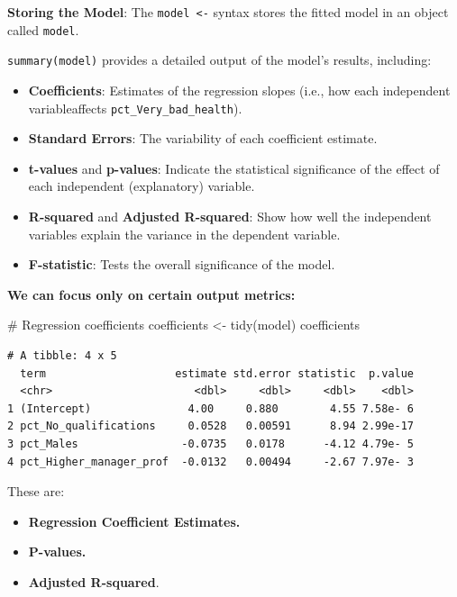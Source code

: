 \documentclass[
  letterpaper,
  DIV=11,
  numbers=noendperiod]{scrreprt}
\newenvironment{Shaded}{\begin{snugshade}}{\end{snugshade}}
\newcommand{\CommentTok}[1]{\textcolor[rgb]{0.37,0.37,0.37}{#1}}
\newcommand{\FunctionTok}[1]{\textcolor[rgb]{0.28,0.35,0.67}{#1}}
\newcommand{\NormalTok}[1]{\textcolor[rgb]{0.00,0.23,0.31}{#1}}
\newcommand{\OtherTok}[1]{\textcolor[rgb]{0.00,0.23,0.31}{#1}}
\providecommand{\tightlist}{%
  \setlength{\itemsep}{0pt}\setlength{\parskip}{0pt}}\usepackage{longtable,booktabs,array}
\begin{document}
\textbf{Storing the Model}: The \texttt{model\ \textless{}-} syntax
stores the fitted model in an object called \texttt{model}.

\texttt{summary(model)} provides a detailed output of the model's
results, including:

\begin{itemize}
\tightlist
\item
  \textbf{Coefficients}: Estimates of the regression slopes (i.e., how
  each independent variableaffects \texttt{pct\_Very\_bad\_health}).
\item
  \textbf{Standard Errors}: The variability of each coefficient
  estimate.
\item
  \textbf{t-values} and \textbf{p-values}: Indicate the statistical
  significance of the effect of each independent (explanatory)
  variable.\\
\item
  \textbf{R-squared} and \textbf{Adjusted R-squared}: Show how well the
  independent variables explain the variance in the dependent variable.
\item
  \textbf{F-statistic}: Tests the overall significance of the model.
\end{itemize}

\textbf{We can focus only on certain output metrics:}

\begin{Shaded}
\begin{Highlighting}[]
\CommentTok{\# Regression coefficients}
\NormalTok{coefficients }\OtherTok{\textless{}{-}} \FunctionTok{tidy}\NormalTok{(model)}
\NormalTok{coefficients}
\end{Highlighting}
\end{Shaded}

\begin{verbatim}
# A tibble: 4 x 5
  term                    estimate std.error statistic  p.value
  <chr>                      <dbl>     <dbl>     <dbl>    <dbl>
1 (Intercept)               4.00     0.880        4.55 7.58e- 6
2 pct_No_qualifications     0.0528   0.00591      8.94 2.99e-17
3 pct_Males                -0.0735   0.0178      -4.12 4.79e- 5
4 pct_Higher_manager_prof  -0.0132   0.00494     -2.67 7.97e- 3
\end{verbatim}

These are:

\begin{itemize}
\tightlist
\item
  \textbf{Regression Coefficient Estimates.}
\item
  \textbf{P-values.}
\item
  \textbf{Adjusted R-squared}.
\end{itemize}
\end{document}
